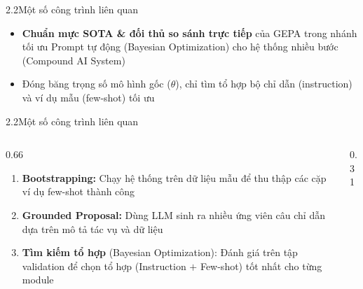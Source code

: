 \begin{frame}{2.2\quad Một số công trình liên quan}
  \vspace{0.4em}
  \begin{itemize}\setlength{\itemsep}{0.6em}
    \item \textbf{Chuẩn mực SOTA \& đối thủ so sánh trực tiếp} của GEPA trong nhánh tối ưu
          Prompt tự động (Bayesian Optimization) cho hệ thống nhiều bước (Compound AI System)
    \item Đóng băng trọng số mô hình gốc ($\theta$), chỉ tìm tổ hợp bộ chỉ dẫn (instruction)
          và ví dụ mẫu (few-shot) tối ưu
  \end{itemize}
\end{frame}

\begin{frame}{2.2\quad Một số công trình liên quan}
  \begin{columns}[T,onlytextwidth]
    \begin{column}{0.66\textwidth}
      \begin{enumerate}\setlength{\itemsep}{0.5em}
        \item \textbf{Bootstrapping:} Chạy hệ thống trên dữ liệu mẫu để thu thập các cặp ví
              dụ few-shot thành công
        \item \textbf{Grounded Proposal:} Dùng LLM sinh ra nhiều ứng viên câu chỉ dẫn dựa
              trên mô tả tác vụ và dữ liệu
        \item \textbf{Tìm kiếm tổ hợp} (Bayesian Optimization): Đánh giá trên tập validation
              để chọn tổ hợp (Instruction $+$ Few-shot) tốt nhất cho từng module
      \end{enumerate}
    \end{column}
    \begin{column}{0.31\textwidth}
      \centering\vspace{-0.3em}
    \end{column}
  \end{columns}
\end{frame}

